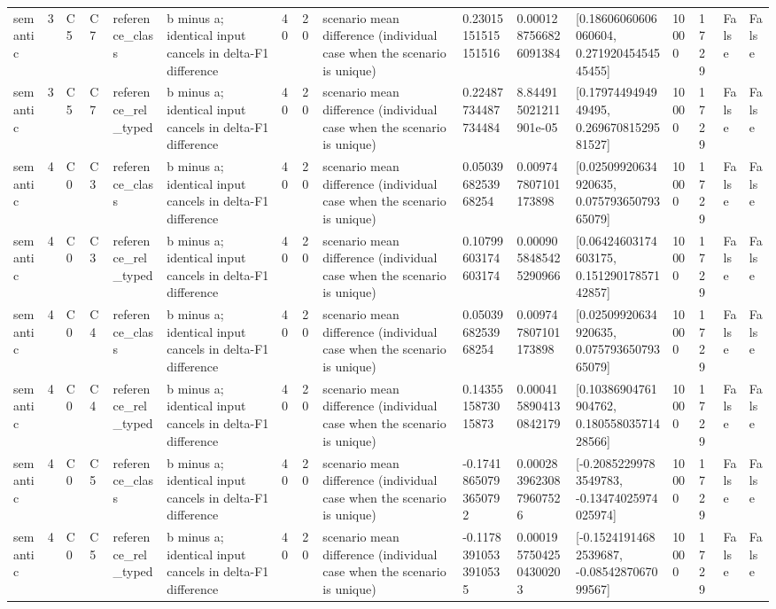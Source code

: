 \begin{tabular}{llllllllllllllll}
semantic & 3 & C5 & C7 & reference\_class & b minus a; identical input cancels in delta-F1 difference & 40 & 20 & scenario mean difference (individual case when the scenario is unique) & 0.23015151515151516 & 0.0001287566826091384 & [0.18606060606060604, 0.27192045454545455] & 10000 & 1729 & False & False \\
semantic & 3 & C5 & C7 & reference\_rel\_typed & b minus a; identical input cancels in delta-F1 difference & 40 & 20 & scenario mean difference (individual case when the scenario is unique) & 0.22487734487734484 & 8.844915021211901e-05 & [0.1797449494949495, 0.26967081529581527] & 10000 & 1729 & False & False \\
semantic & 4 & C0 & C3 & reference\_class & b minus a; identical input cancels in delta-F1 difference & 40 & 20 & scenario mean difference (individual case when the scenario is unique) & 0.0503968253968254 & 0.009747807101173898 & [0.02509920634920635, 0.07579365079365079] & 10000 & 1729 & False & False \\
semantic & 4 & C0 & C3 & reference\_rel\_typed & b minus a; identical input cancels in delta-F1 difference & 40 & 20 & scenario mean difference (individual case when the scenario is unique) & 0.10799603174603174 & 0.0009058485425290966 & [0.06424603174603175, 0.15129017857142857] & 10000 & 1729 & False & False \\
semantic & 4 & C0 & C4 & reference\_class & b minus a; identical input cancels in delta-F1 difference & 40 & 20 & scenario mean difference (individual case when the scenario is unique) & 0.0503968253968254 & 0.009747807101173898 & [0.02509920634920635, 0.07579365079365079] & 10000 & 1729 & False & False \\
semantic & 4 & C0 & C4 & reference\_rel\_typed & b minus a; identical input cancels in delta-F1 difference & 40 & 20 & scenario mean difference (individual case when the scenario is unique) & 0.1435515873015873 & 0.0004158904130842179 & [0.10386904761904762, 0.18055803571428566] & 10000 & 1729 & False & False \\
semantic & 4 & C0 & C5 & reference\_class & b minus a; identical input cancels in delta-F1 difference & 40 & 20 & scenario mean difference (individual case when the scenario is unique) & -0.17418650793650792 & 0.00028396230879607526 & [-0.20852299783549783, -0.13474025974025974] & 10000 & 1729 & False & False \\
semantic & 4 & C0 & C5 & reference\_rel\_typed & b minus a; identical input cancels in delta-F1 difference & 40 & 20 & scenario mean difference (individual case when the scenario is unique) & -0.11783910533910535 & 0.00019575042504300203 & [-0.15241914682539687, -0.0854287067099567] & 10000 & 1729 & False & False \\

\end{tabular}

